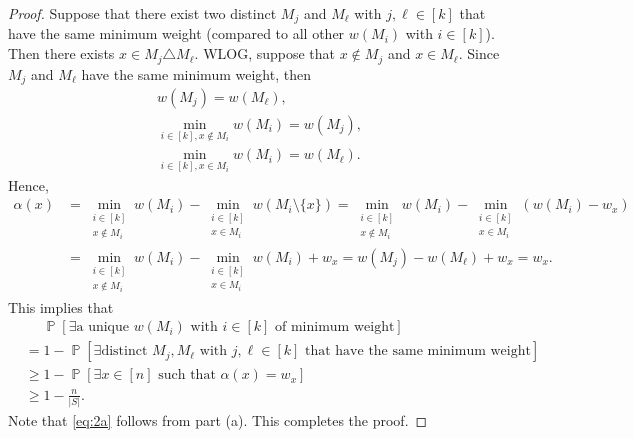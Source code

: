 \documentclass[letterpaper, reqno,11pt]{article}
\newcommand{\PP}{\mathop{{}\mathbb{P}}}
\begin{document}
\begin{enumerate}
\begin{enumerate}
    \bigskip

    \begin{proof}
      Suppose that there exist two distinct $M_j$ and $M_\ell$ with $j, \ell \in [k]$ that have the same minimum weight (compared to all other $w(M_i)$ with $i \in [k]$). Then there exists $x \in M_j \triangle M_\ell$. WLOG, suppose that $x \not \in M_j$ and $x \in M_\ell$. Since $M_j$ and $M_\ell$ have the same minimum weight, then
      \begin{gather*}
        w\left(M_j\right) = w\left(M_\ell\right), \\
        \min_{i \in [k], x \not \in M_i} w(M_i) = w(M_j), \\
        \min_{i \in [k], x \in M_i} w(M_i) = w(M_\ell).
      \end{gather*}
      Hence,
      \begin{align*}
        \alpha(x) &= \min_{\substack{i \in [k] \\ x \not \in M_i}} w\left(M_i\right) - \min_{\substack{i \in [k] \\ x \in M_i}} w\left(M_i \setminus \{ x \}\right) = \min_{\substack{i \in [k] \\ x \not \in M_i}} w\left(M_i\right) - \min_{\substack{i \in [k] \\ x \in M_i}} \left(w\left(M_i\right) - w_x\right) \\
        &= \min_{\substack{i \in [k] \\ x \not \in M_i}} w\left(M_i\right) - \min_{\substack{i \in [k] \\ x \in M_i}} w\left(M_i\right) + w_x = w\left(M_j\right) - w\left(M_\ell\right) + w_x = w_x.
      \end{align*}
      This implies that
      \begin{align}
        &\quad\; \PP\left[\exists \text{a unique $w(M_i)$ with $i \in [k]$ of minimum weight}\right] \nonumber \\
        &= 1 - \PP\left[\exists \text{distinct $M_j, M_\ell$ with $j, \ell \in [k]$ that have the same minimum weight}\right] \nonumber \\
        &\geq 1 - \PP\left[\exists x \in [n] \text{ such that $\alpha(x) = w_x$}\right] \nonumber \\
        &\geq 1 - \frac{n}{|S|}. \label{eq:2a}
      \end{align}
      Note that \eqref{eq:2a} follows from part (a). This completes the proof.
    \end{proof}
  \end{enumerate}


\end{enumerate}
\end{document}
